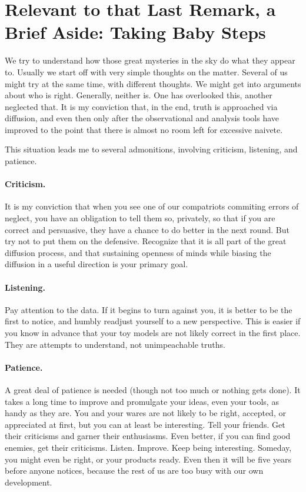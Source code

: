 \documentclass[proceedings]{rmaa}
\begin{document}
\section{Relevant to that Last Remark, a Brief Aside: Taking Baby Steps}
\vspace*{-0.5ex}

We try to understand how those great mysteries in the sky do what they 
appear to.  Usually we start off with very simple thoughts on the 
matter.  Several of us might try at the same time, with different 
thoughts.  We might get into arguments about who is right.  Generally, 
neither is.  One has overlooked this, another neglected that.  It is my 
conviction that, in the end, truth is approached via diffusion, and even  
then only after the observational and analysis tools have improved to the 
point that there is almost no room left for excessive naivete.

        This situation leads me to several admonitions, involving 
criticism, listening, and patience.

\paragraph{Criticism.}  It is my conviction that when you see one of our 
compatriots commiting errors of neglect, you have an obligation to tell 
them so, privately, so that if you are correct and persuasive, they have  
a chance to do better in the next round.  But try not to put them on the  
defensive.  Recognize that it is all part of the great diffusion process, 
and that sustaining openness of minds while biasing the diffusion in a 
useful direction is your primary goal.
\paragraph{Listening.}  Pay attention to the data.  If it begins to turn against  
you, it is better to be the first to notice, and humbly readjust yourself 
to a new perspective.  This is easier if you know in advance that your 
toy models are not likely correct in the first place.  They are attempts  
to understand, not unimpeachable truths.
\paragraph{Patience.}  A great deal of patience is needed (though not too much or 
nothing gets done).  It takes a long time to improve and promulgate your  
ideas, even your tools, as handy as they are.  You and your wares are not 
likely to be right, accepted, or appreciated at first, but you can at 
least be interesting.  Tell your friends.  Get their criticisms and 
garner their enthusiasms.  Even better, if you can find good enemies, get 
their criticisms.  Listen.  Improve.  Keep being interesting.  Someday, 
you might even be right, or your products ready.  Even then it will be 
five years before anyone notices, because the rest of us are too busy 
with our own development.
\vspace*{-0.5ex}
\end{document}
